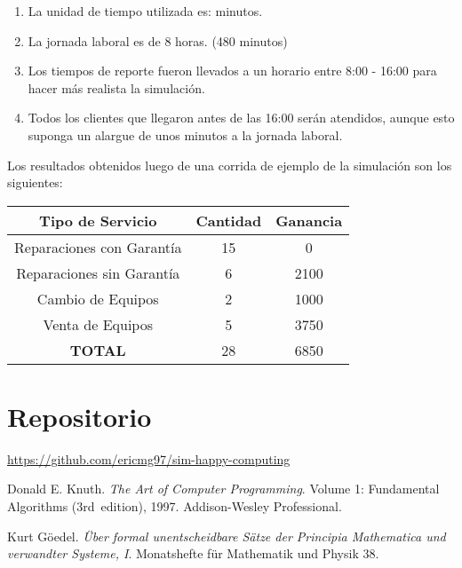 \documentclass[a4paper,10pt,twocolumn]{article}
\begin{document}
\begin{enumerate}
	\item La unidad de tiempo utilizada es: minutos.
	\item La jornada laboral es de 8 horas. (480 minutos)
	\item Los tiempos de reporte fueron llevados a un horario entre 8:00 - 16:00 para hacer más realista la simulación.
	\item Todos los clientes que llegaron antes de las 16:00 serán atendidos, aunque esto suponga un alargue de unos minutos a la jornada laboral.
\end{enumerate}

Los resultados obtenidos luego de una corrida de ejemplo de la simulación son los siguientes:

\begin{center}
	\begin{tabular}[t]{|c|c|c|}
		\hline
		Tipo de Servicio & Cantidad & Ganancia\\
		\hline \hline
		Reparaciones con Garantía & 15 & 0   \\ \hline
		Reparaciones sin Garantía & 6 & 2100 \\ \hline
		Cambio de Equipos & 2 & 1000         \\ \hline
		Venta de Equipos  & 5 & 3750         \\ \hline
		\hline
		\textbf{TOTAL} & 28 & 6850\\
		\hline
	\end{tabular}
\end{center}

\section{Repositorio}\label{sec:conc}

\href{https://github.com/ericmg97/sim-happy-computing}{https://github.com/ericmg97/sim-happy-computing}
\begin{thebibliography}{99}
	 Donald E. Knuth. \emph{The Art of Computer Programming}.
		Volume 1: Fundamental Algorithms (3rd~edition), 1997.
		Addison-Wesley Professional.

	 Kurt Göedel. \emph{Über formal unentscheidbare Sätze der
		Principia Mathematica und verwandter Systeme, I}.
		Monatshefte für Mathematik und Physik 38.

\end{thebibliography}


\label{end}
\end{document}
